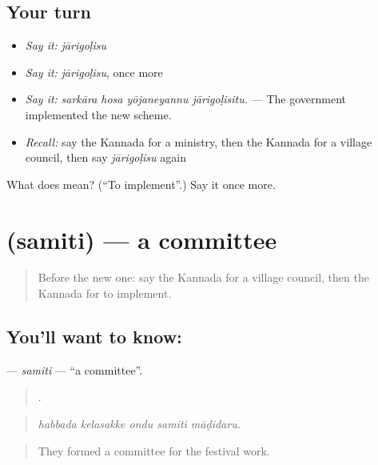 \subsection*{Your turn}
\begin{itemize}
\raggedright
  \item \emph{Say it:} \emph{jārigoḷisu}
  \item \emph{Say it:} \emph{jārigoḷisu}, once more
  \item \emph{Say it:} \emph{sarkāra hosa yōjaneyannu jārigoḷisitu.} — The government implemented the new scheme.
  \item \emph{Recall:} say the Kannada for a ministry, then the Kannada for a village council, then say \emph{jārigoḷisu} again
\end{itemize}

\begin{tcolorbox}[breakable,colback=teal!4,colframe=teal!35!black,title={Before you move on}]
What does  mean? (\textquotedblleft{}To implement\textquotedblright{}.) Say it once more.
\end{tcolorbox}
\section[\texorpdfstring{\kn{ಸಮಿತಿ} (samiti)}{ಸಮಿತಿ (samiti)}]{ (samiti) — a committee}

\label{lesson:KA-C395-samiti}



\begin{quote}
Before the new one: say the Kannada for a village council, then the Kannada for to implement.
\end{quote}

\subsection*{You'll want to know: }
\textbf{} — \emph{samiti} — \textquotedblleft{}a committee\textquotedblright{}.

\begin{quote}
    .
\end{quote}

\begin{quote}
\emph{habbada kelasakke ondu samiti māḍidaru.}
\end{quote}

\begin{quote}
They formed a committee for the festival work.
\end{quote}

